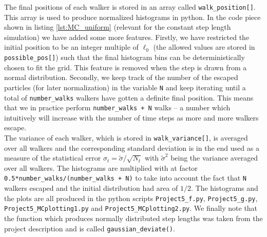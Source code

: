 \documentclass[a4paper, 11pt, notitlepage,english]{article}
\begin{document}
The final positions of each walker is stored in an array called \texttt{walk\_position[]}. This array is used to produce normalized histograms in python. In the code piece shown in listing \ref{lst:MC_uniform} (relevant for the constant step length simulation) we have added some more features. Firstly, we have restricted the initial position to be an integer multiple of $\ell_0$ (the allowed values are stored in \texttt{possible\_pos[]}) such that the final histogram bins can be deterministically chosen to fit the grid. This feature is removed when the step is drawn from a normal distribution. Secondly, we keep track of the number of the escaped particles (for later normalization) in the variable \texttt{N} and keep iterating until a total of \texttt{number\_walks} walkers have gotten a definite final position. This means that we in practice perform \texttt{number\_walks + N} walks – a number which intuitively will increase with the number of time steps as more and more walkers escape. \\

The variance of each walker, which is stored in \texttt{walk\_variance[]}, is averaged over all walkers and the corresponding standard deviation is in the end used  
as a measure of the statistical error $\sigma_t = \tilde{\sigma}/\sqrt{N_t}$ with $\tilde{\sigma}^2$ being the variance averaged over all walkers. The histograms are 
multiplied with at factor \texttt{0.5*number\_walks/(number\_walks + N)} to take into account the fact that \texttt{N} walkers escaped and the initial distribution had area 
of $1/2$. The histograms and the plots are all produced in the python scripts \texttt{Project5\_f.py}, \texttt{Project5\_g.py}, \texttt{Project5\_MCplotting1.py} and 
\texttt{Project5\_MCplotting2.py}. We finally note that the function which produces normally distributed step lengths was taken from the project description 
\cite{Komp3150} and is called \texttt{gaussian\_deviate()}.  \\
\end{document}
